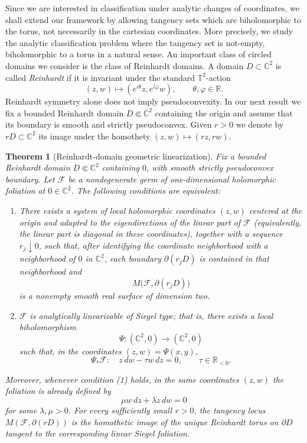 \documentclass[11pt,reqno]{article}
\newtheorem{theorem}{Theorem}
\theoremstyle{remark}
\newcommand{\C}{\mathbb C}
\newcommand{\R}{\mathbb R}
\newcommand{\F}{\mathcal F}
\newcommand{\T}{\mathbb T}
\begin{document}
Since we are interested in classification under analytic changes of coordinates, we shall extend our framework by allowing tangency sets which are biholomorphic 
to the torus, not necessarily in the cartesian coordinates. 
More precisely, we study the analytic classification problem  where the tangency set is not-empty, biholomorphic to a torus in a natural sense.  
An important class of circled domains we consider  is the class of Reinhardt domains. 
A domain $D\subset\C^2$ is called \emph{Reinhardt} if it is invariant under the standard $\T^2$-action
\[
 (z,w)\longmapsto (e^{i\theta}z,e^{i\varphi}w),
 \qquad \theta,\varphi\in\R.
\]
Reinhardt symmetry alone does not imply pseudoconvexity. In our next  result we fix a bounded Reinhardt domain $D\Subset\C^2$ containing the origin and assume that its boundary is smooth and strictly pseudoconvex. Given $r>0$ we denote by $rD\subset \mathbb C^2$ its image under the homothety $(z,w)\longmapsto (rz,rw)$. 
\begin{theorem}[Reinhardt-domain geometric linearization]\label{thm:main}
Fix a bounded Reinhardt domain $D\Subset\C^2$ containing $0$, with smooth strictly pseudoconvex boundary. Let $\F$ be a nondegenerate germ of one-dimensional holomorphic foliation at $0\in\C^2$. The following conditions are equivalent:
\begin{enumerate}
\item There exists a system of local holomorphic coordinates $(z,w)$ centered at the origin and adapted to the eigendirections of the linear part of $\F$ (equivalently, the linear part is diagonal in these coordinates), together with a sequence $r_j\downarrow0$, such that, after identifying the coordinate neighborhood with a neighborhood of $0$ in $\C^2$, each boundary $\partial(r_jD)$ is contained in that neighborhood and
\[
 M\bigl(\F,\partial(r_jD)\bigr)
\]
is a nonempty smooth real surface of dimension two.
\item $\F$ is analytically linearizable of Siegel type; that is, there exists a local biholomorphism
\[
 \Psi:(\C^2,0)\longrightarrow(\C^2,0)
\]
such that, in the coordinates $(z,w)=\Psi(x,y)$,
\[
 \Psi_*\F:\quad z\,dw-\tau w\,dz=0,
 \qquad \tau\in\R_{<0}.
\]

\end{enumerate}
Moreover, whenever condition \textup{(1)} holds, in the same coordinates $(z,w)$ the foliation is already defined by
\[
 \mu w\,dz+\lambda z\,dw=0
\]
for some $\lambda,\mu>0$. For every sufficiently small $r>0$, the tangency locus $M(\F,\partial(rD))$ is the homothetic image of the unique Reinhardt torus on $\partial D$ tangent to the corresponding linear Siegel foliation.
\end{theorem}
\end{document}
